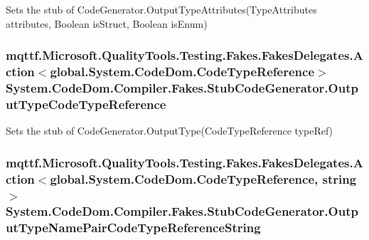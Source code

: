 Sets the stub of Code\-Generator.\-Output\-Type\-Attributes(\-Type\-Attributes attributes, Boolean is\-Struct, Boolean is\-Enum)

\hypertarget{class_system_1_1_code_dom_1_1_compiler_1_1_fakes_1_1_stub_code_generator_a0a58e6feed71b50cd8e9b8310b05abb4}{
\subsubsection[{Output\-Type\-Code\-Type\-Reference}]{\setlength{\rightskip}{0pt plus 5cm}mqttf.\-Microsoft.\-Quality\-Tools.\-Testing.\-Fakes.\-Fakes\-Delegates.\-Action$<$global.\-System.\-Code\-Dom.\-Code\-Type\-Reference$>$ System.\-Code\-Dom.\-Compiler.\-Fakes.\-Stub\-Code\-Generator.\-Output\-Type\-Code\-Type\-Reference}}\label{class_system_1_1_code_dom_1_1_compiler_1_1_fakes_1_1_stub_code_generator_a0a58e6feed71b50cd8e9b8310b05abb4}


Sets the stub of Code\-Generator.\-Output\-Type(\-Code\-Type\-Reference type\-Ref)

\hypertarget{class_system_1_1_code_dom_1_1_compiler_1_1_fakes_1_1_stub_code_generator_ac08a49491b242ab94f3ce3cafc81c0b4}{
\subsubsection[{Output\-Type\-Name\-Pair\-Code\-Type\-Reference\-String}]{\setlength{\rightskip}{0pt plus 5cm}mqttf.\-Microsoft.\-Quality\-Tools.\-Testing.\-Fakes.\-Fakes\-Delegates.\-Action$<$global.\-System.\-Code\-Dom.\-Code\-Type\-Reference, string$>$ System.\-Code\-Dom.\-Compiler.\-Fakes.\-Stub\-Code\-Generator.\-Output\-Type\-Name\-Pair\-Code\-Type\-Reference\-String}}\label{class_system_1_1_code_dom_1_1_compiler_1_1_fakes_1_1_stub_code_generator_ac08a49491b242ab94f3ce3cafc81c0b4}



